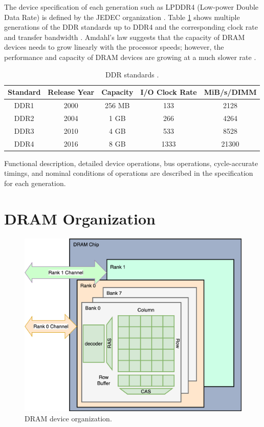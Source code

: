 The device specification of each generation such as LPDDR4 (Low-power Double Data Rate) is defined by the JEDEC organization \cite{jedec}. Table \ref{tab:standards} shows multiple generations of the DDR standards up to DDR4 and the corresponding clock rate and transfer bandwidth \cite{patterson}. Amdahl's law suggests that the capacity of DRAM devices needs to grow linearly with the processor speeds; however, the performance and capacity of DRAM devices are growing at a much slower rate \cite{patterson}. 
\begin{table}[]
    \centering
    \begin{tabular}{c|c|c|c|c}
         Standard & Release Year & Capacity & I/O Clock Rate & MiB/s/DIMM \\
         \hline
         DDR1 & 2000 & 256 MB & 133 & 2128 \\
         DDR2 & 2004 & 1 GB & 266 & 4264 \\
         DDR3 & 2010 & 4 GB & 533 & 8528 \\
         DDR4 & 2016 & 8 GB & 1333 & 21300\\
    \end{tabular}
    \caption{DDR standards \cite{patterson}.}
    \label{tab:standards}
\end{table}
Functional description, detailed device operations, bus operations, cycle-accurate timings, and nominal conditions of operations are described in the 
specification for each generation. 
\section{DRAM Organization}

\begin{figure}[h]
    \centering
    \includegraphics[scale=.14]{images/rank-bank.png}
    \caption{DRAM device organization.}
    \label{fig:rank-bank}
\end{figure}

